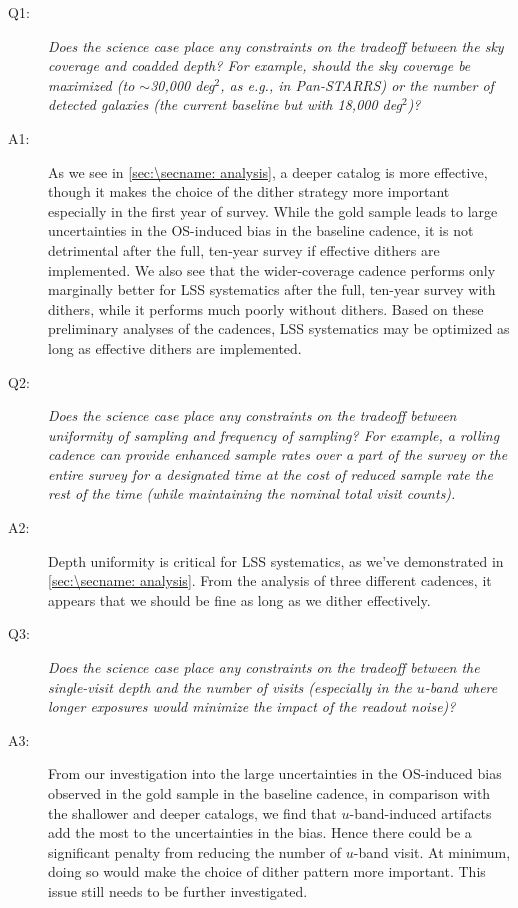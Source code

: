 \begin{description}

\item[Q1:] {\it Does the science case place any constraints on the
tradeoff between the sky coverage and coadded depth? For example, should
the sky coverage be maximized (to $\sim$30,000 deg$^2$, as e.g., in
Pan-STARRS) or the number of detected galaxies (the current baseline but
with 18,000 deg$^2$)?}

\item[A1:] As we see in \autoref{sec:\secname: analysis}, a deeper
catalog is more effective, though it makes the choice of the dither
strategy more important especially in the first year of survey. While
the gold sample leads to large uncertainties in the OS-induced bias in
the baseline cadence, it is not detrimental after the full, ten-year
survey if effective dithers are implemented. We also see that the
wider-coverage cadence  performs only marginally
better for LSS systematics after the full, ten-year survey with dithers,
while it performs much poorly without dithers. Based on these
preliminary analyses of the cadences, LSS systematics may be optimized
as long as effective dithers are implemented.

\item[Q2:] {\it Does the science case place any constraints on the
tradeoff between uniformity of sampling and frequency of  sampling? For
example, a rolling cadence can provide enhanced sample rates over a part
of the survey or the entire survey for a designated time at the cost of
reduced sample rate the rest of the time (while maintaining the nominal
total visit counts).}

\item[A2:] Depth uniformity is critical for LSS systematics, as we've
demonstrated in \autoref{sec:\secname: analysis}. From the analysis of
three different cadences, it appears that we should be fine as long as
we dither effectively.

\item[Q3:] {\it Does the science case place any constraints on the
tradeoff between the single-visit depth and the number of visits
(especially in the $u$-band where longer exposures would minimize the
impact of the readout noise)?}

\item[A3:] From our investigation into the large uncertainties in the
OS-induced bias observed in the gold sample in the baseline cadence, in
comparison with the shallower and deeper catalogs, we find that
$u$-band-induced artifacts add the most to the uncertainties in the
bias. Hence there could be a significant penalty from reducing the
number of $u$-band visit. At minimum, doing so would make the choice of
dither pattern more important. This issue still needs to be further
investigated.


\end{description}
